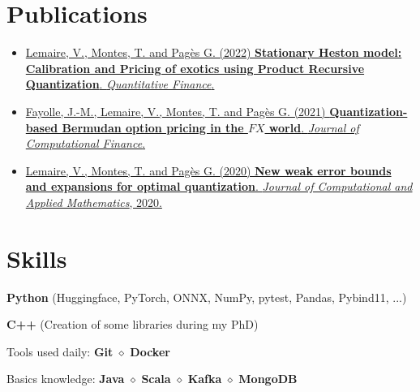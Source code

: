 \documentclass[]{deedy-resume-openfont}
\begin{document}
	\sectionsep
	\vspace{\topsep}

	\section{Publications}
	\sectionsep
	\begin{itemize}
		\item[\diamond] \href{https://www.tandfonline.com/doi/abs/10.1080/14697688.2021.2023205?journalCode=rquf20}{Lemaire, V., Montes, T. and Pagès G. (2022) \textbf{Stationary Heston model: Calibration and Pricing of exotics using Product Recursive Quantization}. \textit{Quantitative Finance}.}

		\item[\diamond] \href{https://www.risk.net/journal-of-computational-finance/7869926/quantization-based-bermudan-option-pricing-in-the-foreign-exchange-world}{Fayolle, J.-M., Lemaire, V., Montes, T. and Pagès G. (2021) \textbf{Quantization-based Bermudan option pricing in the $FX$ world}. \textit{Journal of Computational Finance}.}

		\item[\diamond] \href{https://www.sciencedirect.com/science/article/abs/pii/S0377042719306752}{Lemaire, V., Montes, T. and Pagès G. (2020) \textbf{New weak error bounds and expansions for optimal quantization}. \textit{Journal of Computational and Applied Mathematics}, 2020.}
	\end{itemize}

\sectionsep


	\section{Skills}
	\sectionsep

	\sectionsep
	\vspace{0.1cm}
	\begin{tightemize}
		\item[\diamond] \textbf{Python} (Huggingface, PyTorch, ONNX, NumPy, pytest, Pandas, Pybind11, ...)
		\item[\diamond] \textbf{C++} (Creation of some libraries during my PhD)
		\item[\diamond] Tools used daily: \textbf{Git} $\diamond$ \textbf{Docker}
		\item[\diamond] Basics knowledge: \textbf{Java} $\diamond$ \textbf{Scala} $\diamond$ \textbf{Kafka} $\diamond$ \textbf{MongoDB}
	\end{tightemize}
\end{document}
